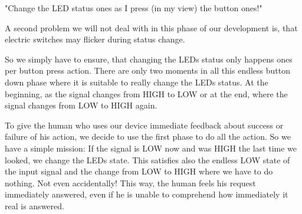 "Change the LED status ones as I press (in my view) the button ones!"

A second problem we will not deal with in this phase of our development is, that electric switches may flicker during status change.

So we simply have to ensure, that changing the LEDs status only happens ones per button press action. There are only two moments in all this endless button down phase where it is suitable to really change the LEDs status. At the beginning, as the signal changes from HIGH to LOW or at the end, where the signal changes from LOW to HIGH again.

To give the human who uses our device immediate feedback about success or failure of his action, we decide to use the first phase to do all the action. So we have a simple mission: If the signal is LOW now and was HIGH the last time we looked, we change the LEDs state. This satisfies also the endless LOW state of the input signal and the change from LOW to HIGH where we have to do nothing. Not even accidentally! This way, the human feels his request immediately answered, even if he is unable to comprehend how immediately it real is answered.

